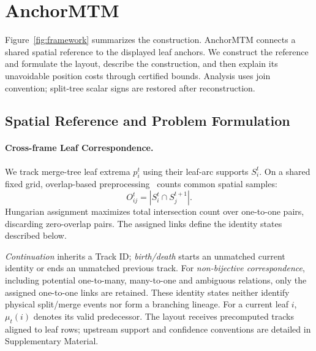 \documentclass{vgtc}                %
\begin{document}
\section{AnchorMTM}\label{sec:method}
Figure~\ref{fig:framework} summarizes the construction. AnchorMTM connects a shared spatial reference to the displayed leaf anchors. We construct the reference and formulate the layout, describe the construction, and then explain its unavoidable position costs through certified bounds. Analysis uses join convention; split-tree scalar signs are restored after reconstruction.

\subsection{Spatial Reference and Problem Formulation}\label{sec:reference}
\paragraph{Cross-frame Leaf Correspondence.}
We track merge-tree leaf extrema $p_i^t$ using their leaf-arc supports $S_i^t$. On a shared fixed grid, overlap-based preprocessing~\cite{STMTM:2026} counts common spatial samples:
\begin{equation}\label{eq:overlap}
 O_{ij}^t=|S_i^t\cap S_j^{t+1}|.
\end{equation}
Hungarian assignment maximizes total intersection count over one-to-one pairs, discarding zero-overlap pairs. The assigned links define the identity states described below.

\emph{Continuation} inherits a Track ID; \emph{birth/death} starts an unmatched current identity or ends an unmatched previous track. For \emph{non-bijective correspondence}, including potential one-to-many, many-to-one and ambiguous relations, only the assigned one-to-one links are retained. These identity states neither identify physical split/merge events nor form a branching lineage. For a current leaf $i$, $\mu_t(i)$ denotes its valid predecessor. The layout receives precomputed tracks aligned to leaf rows; upstream support and confidence conventions are detailed in Supplementary Material.

\end{document}
